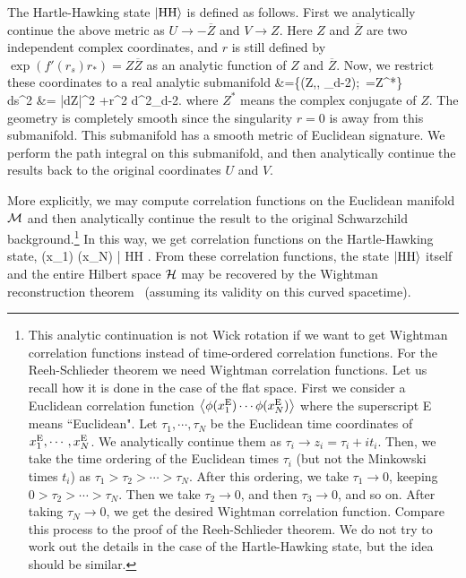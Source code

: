 \documentclass[a4paper,11pt]{article}
\theoremstyle{plain}
\theoremstyle{definition}
\numberwithin{thm}{section}
\newcommand{\vev}[1]{ \left\langle {#1} \right\rangle }
\newcommand{\bra}[1]{ \langle {#1} | }
\newcommand{\ket}[1]{ | {#1} \rangle }
\def\CH{{\cal H}}
\def\CM{{\cal M}}
\def\beq#1\eeq{\begin{align}#1\end{align}}
\begin{document}
The Hartle-Hawking state $\ket{{\rm HH}}$ is defined as follows. First we analytically continue the above metric 
as $U \to - \overline{Z}$ and $V \to Z$. Here $Z$ and $\overline{Z}$ are two independent complex coordinates, and $r$ is still defined by 
$\exp(f'(r_s)r_*)=Z\overline{Z}$ as an analytic function of $Z$ and $\overline{Z}$. Now, we restrict these coordinates to a real analytic submanifold 
\beq
\CM &=\{(Z,, \Omega_{d-2});~=Z^*\} \\
ds^2 &=  |dZ|^2 +r^2 d\Omega^2_{d-2}.
\eeq
where $Z^*$ means the complex conjugate of $Z$.
The geometry is completely smooth since the singularity $r=0$ is away from this submanifold. This submanifold has a smooth metric of Euclidean signature.
We perform the path integral on this submanifold, and then analytically continue the results back to the original coordinates $U$ and $V$.

More explicitly, we may compute correlation functions on the Euclidean manifold $\CM$ and then analytically continue the result to the original Schwarzchild background.\footnote{
This analytic continuation is not Wick rotation if we want to get Wightman correlation functions instead of time-ordered correlation functions.
For the Reeh-Schlieder theorem we need Wightman correlation functions. Let us recall how it is done in the case of the flat space.
First we consider a Euclidean correlation function $\vev{\phi(x_1^{\rm E} ) \cdots \phi(x^{\rm E}_N)}$ where the superscript E means ``Euclidean".
Let $\tau_1, \cdots, \tau_N$ be the Euclidean time coordinates of $x^{\rm E}_1, \cdots, x^{\rm E}_N$. We analytically continue them
as $\tau_i \to z_i = \tau_i+i t_i $. Then, we take the time ordering of the Euclidean times $\tau_i$ (but not the Minkowski times $t_i$) as
$\tau_1>\tau_2 > \cdots > \tau_N$. After this ordering, we take $\tau_1 \to 0$, keeping $0>\tau_2> \cdots >\tau_N$. Then we take $\tau_2 \to 0$, and then $\tau_3 \to 0$, and so on.
After taking $\tau_N \to 0$, we get the desired Wightman correlation function. Compare this process to the proof of the Reeh-Schlieder theorem.
We do not try to work out the details in the case of the Hartle-Hawking state, but the idea should be similar.}
In this way, we get correlation functions on the Hartle-Hawking state, 
\beq
\bra{{\rm HH}} \phi(x_1) \cdots \phi(x_N) \ket{{\rm HH}}.
\eeq
From these correlation functions, the state $\ket{{\rm HH}}$ itself and the entire Hilbert space $\CH$ may be recovered
by the Wightman reconstruction theorem~\cite{Streater:1989vi} (assuming its validity on this curved spacetime).
\end{document}
